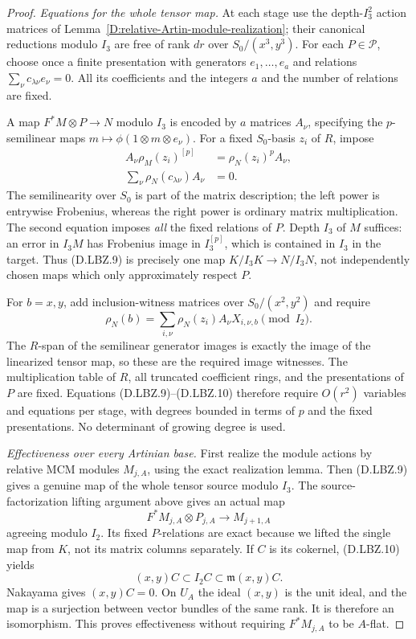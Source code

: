 \begin{proof}
\emph{Equations for the whole tensor map.}
At each stage use the depth-$I_3^2$ action matrices
of Lemma~\ref{D:relative-Artin-module-realization};
their canonical reductions modulo $I_3$ are free
of rank $dr$ over $S_0/(x^3,y^3)$.
For each $P\in\mathscr P$, choose once a finite
presentation with generators $e_1,\ldots,e_a$
and relations
$\sum_\nu c_{\lambda\nu}e_\nu=0$.
All its coefficients and the integers $a$ and
the number of relations are fixed.

A map
$F^*M\otimes P\to N$ modulo $I_3$ is encoded by
$a$ matrices $A_\nu$, specifying the $p$-semilinear
maps $m\mapsto\phi(1\otimes m\otimes e_\nu)$.
For a fixed $S_0$-basis $z_i$ of $R$, impose
\[
 \begin{split}
 A_\nu\rho_M(z_i)^{[p]}&=\rho_N(z_i)^p A_\nu,\\
 \sum_\nu\rho_N(c_{\lambda\nu})A_\nu&=0.
 \end{split}                                            \tag{D.LBZ.9}
\]
The semilinearity over $S_0$ is part of the matrix
description; the left power is entrywise Frobenius,
whereas the right power is ordinary matrix
multiplication.  The second equation imposes
\emph{all} the fixed relations of $P$.
Depth $I_3$ of $M$ suffices: an error in $I_3M$
has Frobenius image in $I_3^{[p]}$, which is
contained in $I_3$ in the target.
Thus (D.LBZ.9) is precisely one map
$K/I_3K\to N/I_3N$, not independently chosen
maps which only approximately respect $P$.

For $b=x,y$, add inclusion-witness matrices over
$S_0/(x^2,y^2)$ and require
\[
       \rho_N(b)=
          \sum_{i,\nu}\rho_N(z_i)A_\nu X_{i,\nu,b}
                                      \pmod {I_2}.       \tag{D.LBZ.10}
\]
The $R$-span of the semilinear generator images
is exactly the image of the linearized tensor
map, so these are the required image witnesses.
The multiplication table of $R$, all truncated
coefficient rings, and the presentations of
$P$ are fixed.  Equations (D.LBZ.9)--(D.LBZ.10)
therefore require $O(r^2)$ variables and equations
per stage, with degrees bounded in terms of
$p$ and the fixed presentations.  No determinant
of growing degree is used.

\emph{Effectiveness over every Artinian base.}
First realize the module actions by relative
MCM modules $M_{j,A}$, using the exact realization
lemma.  Then (D.LBZ.9) gives a genuine map of the
whole tensor source modulo $I_3$.
The source-factorization lifting argument above
gives an actual map
\[
                F^*M_{j,A}\otimes P_{j,A}\longrightarrow
                                                     M_{j+1,A}
\]
agreeing modulo $I_2$.  Its fixed $P$-relations
are exact because we lifted the single map
from $K$, not its matrix columns separately.
If $C$ is its cokernel, (D.LBZ.10) yields
\[
               (x,y)C\subset I_2C
                          \subset\mathfrak m(x,y)C.
                                                        \tag{D.LBZ.11}
\]
Nakayama gives $(x,y)C=0$.
On $U_A$ the ideal $(x,y)$ is the unit ideal,
and the map is a surjection between vector
bundles of the same rank.  It is therefore
an isomorphism.  This proves effectiveness
without requiring $F^*M_{j,A}$ to be $A$-flat.


\end{proof}
